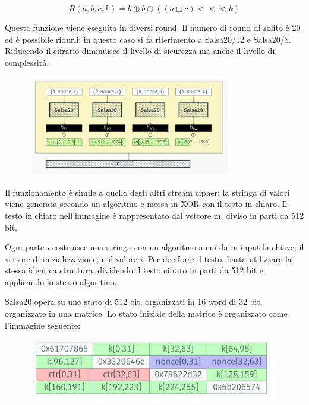 \[R(a,b,c,k) = b \oplus b \oplus ((a \boxplus c) <<< k) \]

Questa funzione viene eseguita in diversi round. Il numero di round di solito è 20 ed è possibile ridurli: in questo caso si fa riferimento a Salsa20/12 e Salsa20/8. Riducendo il cifrario diminuisce il livello di sicurezza ma anche il livello di complessità. 

\begin{figure}[htb!]
    \centering
    \includegraphics[width=9cm]{./Images/cap1/1.37.png}
\end{figure} 

Il funzionamento è simile a quello degli altri stream cipher: la stringa di valori viene generata secondo un algoritmo e messa in XOR con il testo in chiaro. Il testo in chiaro nell'immagine è rappresentato dal vettore m, diviso in parti da 512 bit.

Ogni parte \textit{i} costruisce una stringa con un algoritmo a cui da in input la chiave, il vettore di inizializzazione, e il valore \textit{i}. Per decifrare il testo, basta utilizzare la stessa identica struttura, dividendo il testo cifrato in parti da 512 bit e applicando lo stesso algoritmo. 

\vspace{5mm}

Salsa20 opera su uno stato di 512 bit, organizzati in 16 word di 32 bit, organizzate in una matrice. Lo stato iniziale della matrice è organizzato come l'immagine seguente:

\begin{figure}[htb!]
    \centering
    \includegraphics[width=11cm]{./Images/cap1/1.38.png}
\end{figure} 

